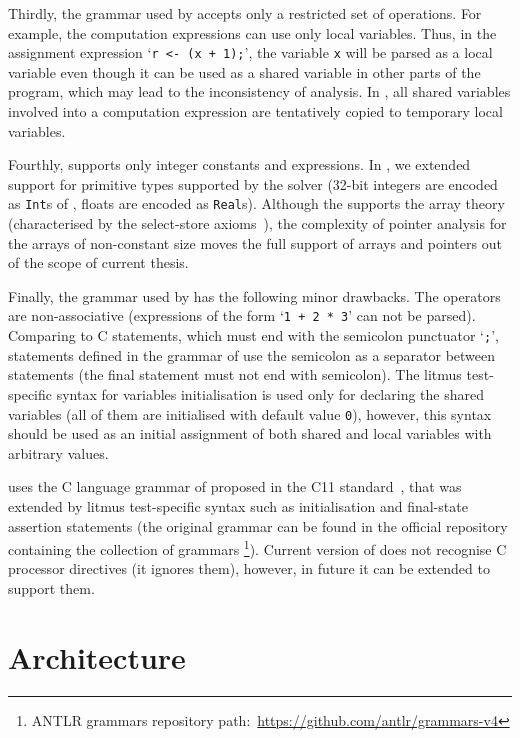 Thirdly, the grammar used by \oldporthos{} accepts only a restricted set of operations.
For example, the computation expressions can use only local variables.
Thus, in the assignment expression `\lstinline{r <- (x + 1);}', the variable \lstinline{x} will be parsed as a local variable even though it can be used as a shared variable in other parts of the program, which may lead to the inconsistency of analysis.
In \porthos[2], all shared variables involved into a computation expression are tentatively copied to temporary local variables.

Fourthly, \porthos[1] supports only integer constants and expressions.
In \porthos[2], we extended support for primitive types supported by the  solver (32-bit integers are encoded as \texttt{Int}s of , floats are encoded as \texttt{Real}s).
Although the  supports the array theory (characterised by the select-store axioms~\cite{de2011z3}), the complexity of pointer analysis for the arrays of non-constant size moves the full support of arrays and pointers out of the scope of current thesis.

Finally, the grammar used by \porthos{} has the following minor drawbacks. %
The operators are non-associative (expressions of the form `\lstinline{1 + 2 * 3}' can not be parsed).
Comparing to C statements, which must end with the semicolon punctuator `\lstinline{;}', statements defined in the grammar of \porthos[1] use the semicolon as a separator between statements (the final statement must not end with semicolon).
The litmus test-specific syntax for variables initialisation is used only for declaring the shared variables (all of them are initialised with default value \lstinline{0}), however, this syntax should be used as an initial assignment of both shared and local variables with arbitrary values.

\porthos[2] uses the C language grammar of proposed in the C11 standard~\cite{c11}, that was extended by litmus test-specific syntax such as initialisation and final-state assertion statements (the original  grammar can be found in the official repository containing the collection of  grammars%
%
\footnote{ANTLR grammars repository path:~\url{https://github.com/antlr/grammars-v4}}). %
%
Current version of \porthos[2] does not recognise C processor directives (it ignores them), however, in future it can be extended to support them.


\section{Architecture}
\label{ch:impl:arch}

